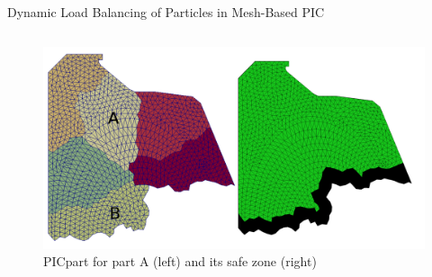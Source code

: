 \documentclass[aspectratio=169]{beamer}
\begin{document}
\begin{frame}{Dynamic Load Balancing of Particles in Mesh-Based PIC}
\begin{columns}
\begin{column}{0.3\linewidth}
\begin{figure}
        \includegraphics[width=\textwidth]{picpart.png}
        \caption*{PICpart for part A (left) and its safe zone (right)}
      \end{figure}
    \end{column}
  \end{columns}

\end{frame}
\end{document}
